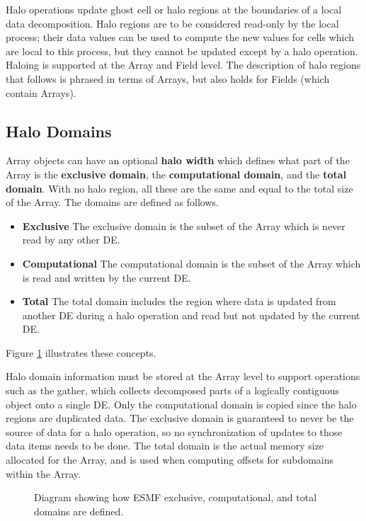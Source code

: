 
\label{sec:halo}
Halo operations update ghost cell or halo regions at the boundaries
of a local data decomposition.  Halo regions are to be considered
read-only by the local process; their data values can be used to
compute the new values for cells which are local to this process,
but they cannot be updated except by a halo operation.  Haloing is
supported at the Array and Field level.  The description of halo
regions that follows is phrased in terms of Arrays, but also holds
for Fields (which contain Arrays).

\subsection{Halo Domains}

Array objects can have an optional {\bf halo width} which defines
what part of the Array is the {\bf exclusive domain}, the {\bf computational
domain}, and the {\bf total domain}.  With no halo region, all these are
the same and equal to the total size of the Array.  The domains are
defined as follows.

\begin{itemize}

\item {\bf Exclusive}  The exclusive domain is the subset of the
Array which is never read by any other DE.  

\item {\bf Computational}  The computational domain
is the subset of the Array which is read and written by the current DE.

\item {\bf Total}  The total domain includes the region where data is 
updated from another DE during a halo operation and read but not 
updated by the current DE.  

\end{itemize}

Figure \ref{fig:halo} illustrates these concepts.

Halo domain information must be stored at the Array level to
support operations such as the gather, which collects
decomposed parts of a logically contiguous object onto a single DE.
Only the computational domain is copied since the halo regions are
duplicated data.  The exclusive domain is guaranteed to never be
the source of data for a halo operation, so no synchronization
of updates to those data items needs to be done.  The total
domain is the actual memory size allocated for the Array,
and is used when computing offsets for subdomains within the Array.

\begin{center}
\begin{figure}
\caption{Diagram showing how ESMF exclusive, computational,
and total domains are defined.  }
\label{fig:halo}
\end{figure}
\end{center}


